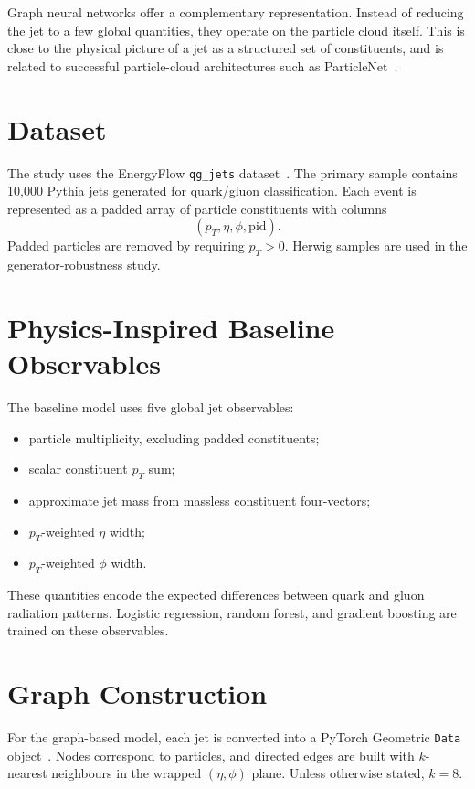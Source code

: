 \documentclass[11pt,a4paper]{article}
\begin{document}
Graph neural networks offer a complementary representation. Instead of reducing
the jet to a few global quantities, they operate on the particle cloud itself.
This is close to the physical picture of a jet as a structured set of
constituents, and is related to successful particle-cloud architectures such as
ParticleNet~\cite{qu2020particlenet}.

\section{Dataset}

The study uses the EnergyFlow \texttt{qg\_jets} dataset~\cite{komiske2019energyflow}.
The primary sample contains 10,000 Pythia jets generated for quark/gluon
classification. Each event is represented as a padded array of particle
constituents with columns
\[
  (p_T, \eta, \phi, \mathrm{pid}) .
\]
Padded particles are removed by requiring $p_T > 0$. Herwig samples are used in
the generator-robustness study.

\section{Physics-Inspired Baseline Observables}

The baseline model uses five global jet observables:
\begin{itemize}
  \item particle multiplicity, excluding padded constituents;
  \item scalar constituent $p_T$ sum;
  \item approximate jet mass from massless constituent four-vectors;
  \item $p_T$-weighted $\eta$ width;
  \item $p_T$-weighted $\phi$ width.
\end{itemize}
These quantities encode the expected differences between quark and gluon
radiation patterns. Logistic regression, random forest, and gradient boosting
are trained on these observables.

\section{Graph Construction}

For the graph-based model, each jet is converted into a PyTorch Geometric
\texttt{Data} object~\cite{fey2019pyg}. Nodes correspond to particles, and
directed edges are built with $k$-nearest neighbours in the wrapped
$(\eta,\phi)$ plane. Unless otherwise stated, $k=8$.
\end{document}
